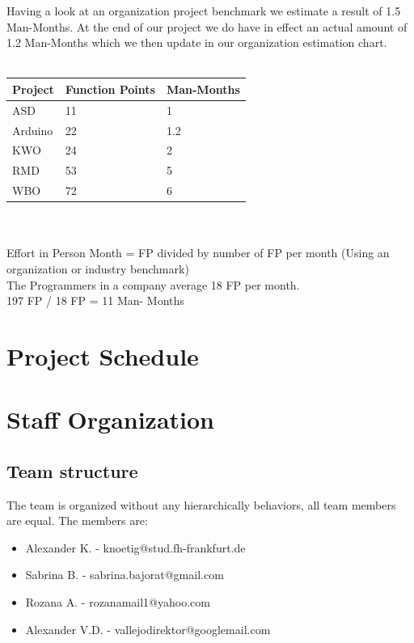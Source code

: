 \documentclass[
	11pt,
	a4paper
]{article}%
\begin{document}
Having a look at an organization project benchmark we estimate a result of 1.5 Man-Months. At the end of our project we do have in effect an actual amount of 1.2 Man-Months which we then update in our organization estimation chart.\\\\
\begin{tabular}{|l|l|l|}
\hline
    \rowcolor{dunkelgrau}
	Project & Function Points 	& Man-Months 	\\ \hline
	ASD 	& 11 				& 1				\\ \hline
	Arduino	& 22				& 1.2			\\ \hline
	KWO 	& 24 				& 2				\\ \hline
	RMD 	& 53 				& 5				\\ \hline
	WBO 	& 72 				& 6				\\ \hline
\end{tabular}\\\\
Effort in Person Month = FP divided by number of FP per month (Using an organization or industry benchmark)\\
The Programmers in a company average 18 FP per month.\\
197 FP / 18 FP = 11 Man- Months


\section{Project Schedule}


\section{Staff Organization}
\subsection{Team structure}
The team is organized without any hierarchically behaviors, all team members are equal. The members are:
\begin{itemize}
	\item Alexander K. - knoetig@stud.fh-frankfurt.de
	\item Sabrina B. - sabrina.bajorat@gmail.com
	\item Rozana A. - rozanamail1@yahoo.com
	\item Alexander V.D. - vallejodirektor@googlemail.com
\end{itemize}
\end{document}
